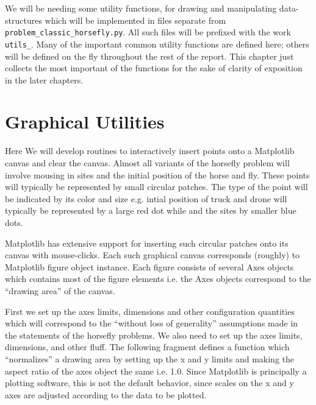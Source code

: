 \documentclass[11.5pt]{report}
\begin{document}
We will be needing some utility functions, for drawing and manipulating data-structures 
which will be implemented in files separate from \verb|problem_classic_horsefly.py|.  All such
files will be prefixed with the work \verb|utils_|. Many of the important common utility 
functions are defined here; others will be defined on the fly throughout the rest of the report. 
This chapter just collects the most important of the functions for the sake of clarity of exposition
in the later chapters. 

\section{Graphical Utilities}

Here We will  develop routines to interactively insert points onto a Matplotlib canvas and clear the canvas. 
Almost all variants of the horsefly problem will involve mousing in sites and the initial position of the horse 
and fly. These points will typically be represented by small circular patches. The type of the point
will be indicated by its color and size e.g. intial position of truck and drone 
will typically be represented by a large red dot while and the sites by smaller blue dots. 

Matplotlib has extensive support for inserting such circular patches onto its canvas with 
mouse-clicks. Each such graphical canvas corresponds (roughly) to Matplotlib figure
object instance. Each figure consists of several Axes objects which contains
most of the figure elements i.e. the Axes objects correspond to the ``drawing area''
of the canvas. 

\newchunk First we set up the axes limits, dimensions and other configuration quantities
which will correspond to the ``without loss of generality'' assumptions made in the 
statements of the horsefly problems. We also need to set up the axes limits,
dimensions, and other fluff. The following fragment defines a function which 
``normalizes'' a drawing area by setting up the x and y limits and making the 
aspect ratio of the axes object the same i.e. 1.0. Since Matplotlib is principally
a plotting software, this is not the default behavior, since scales on the x and y 
axes are adjusted according to the data to be plotted. 
\end{document}
